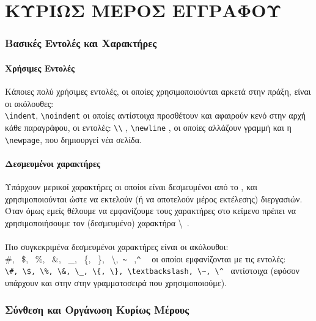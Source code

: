 \documentclass[a4paper, 12pt, oneside, xelatex, final]{article}
\begin{document}
\newpage
\part{ΚΥΡΙΩΣ ΜΕΡΟΣ ΕΓΓΡΑΦΟΥ}

\section{Βασικές Εντολές και Χαρακτήρες}
	\subsection{Χρήσιμες Εντολές}
	\noindent Κάποιες πολύ χρήσιμες εντολές, οι οποίες χρησιμοποιούνται αρκετά στην πράξη, είναι οι ακόλουθες:\\
	\verb+\indent+, \verb+\noindent+ οι οποίες αντίστοιχα προσθέτουν και αφαιρούν κενό στην αρχή κάθε παραγράφου, οι εντολές:\; \verb+\\+ \;, \verb+\newline+ , οι οποίες αλλάζουν γραμμή και η \verb+\newpage+, που δημιουργεί νέα σελίδα.
	\subsection{Δεσμευμένοι χαρακτήρες}
	\noindent Υπάρχουν μερικοί χαρακτήρες οι οποίοι είναι δεσμευμένοι από το \XeLaTeX, και χρησιμοποιούνται ώστε να εκτελούν (ή να αποτελούν μέρος εκτέλεσης) διεργασιών. Όταν όμως εμείς θέλουμε να εμφανίζουμε τους χαρακτήρες στο κείμενο πρέπει να χρησιμοποιήσουμε τον (δεσμευμένο) χαρακτήρα \textbackslash \ .\\ \\
	Πιο συγκεκριμένα δεσμευμένοι χαρακτήρες είναι οι ακόλουθοι:\\
	\#, \ \$, \ \%, \ \&, \ \_, \ \{, \ \}, \ \textbackslash ,\ \verb+~+ \ ,\verb+^+ \ $\mspace{2mu}$ οι οποίοι εμφανίζονται με τις εντολές:\\
	\verb|\#, \$, \%, \&, \_, \{, \}, \textbackslash, \~, \^| \ αντίστοιχα (εφόσον υπάρχουν και στην στην γραμματοσειρά που χρησιμοποιούμε).

\section{Σύνθεση και Οργάνωση Κυρίως Μέρους}
\end{document}
